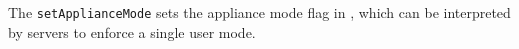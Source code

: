 The \verb+setApplianceMode+ sets the appliance mode flag in \Rapture, which can be
interpreted by \Rapture servers to enforce a single user mode.
